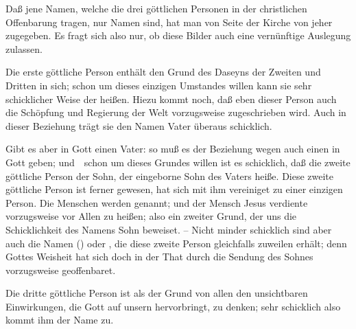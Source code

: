 Daß jene Namen, welche die drei göttlichen Personen in der christlichen Offenbarung tragen, nur  Namen sind, hat man von Seite der Kirche von jeher zugegeben. Es fragt sich also nur, ob diese Bilder auch eine vernünftige Auslegung zulassen.
\begin{aufza}
\item Die erste göttliche Person enthält den Grund des Daseyns der Zweiten und Dritten in sich; schon um dieses einzigen Umstandes willen kann sie sehr schicklicher Weise der  heißen. Hiezu kommt noch, daß eben dieser Person auch die Schöpfung und Regierung der Welt vorzugsweise zugeschrieben wird. Auch in dieser Beziehung trägt sie den Namen Vater überaus schicklich.
\item Gibt es aber in Gott einen Vater: so muß es der Beziehung wegen auch einen  in Gott geben; und~\ schon um dieses Grundes willen ist es schicklich, daß die zweite göttliche Person der Sohn, der eingeborne Sohn des Vaters heiße. Diese zweite göttliche Person ist ferner  gewesen, hat sich mit ihm vereiniget zu einer einzigen Person. Die Menschen werden  genannt; und der Mensch Jesus verdiente vorzugsweise vor Allen  zu heißen; also ein zweiter Grund, der uns die Schicklichkeit des Namens Sohn beweiset. -- Nicht minder schicklich sind aber auch die Namen  () oder , die diese zweite Person gleichfalls zuweilen erhält; denn Gottes Weisheit hat sich doch in der That durch die Sendung des Sohnes vorzugsweise geoffenbaret.
\item Die dritte göttliche Person ist als der Grund von allen den unsichtbaren Einwirkungen, die Gott auf unsern  hervorbringt, zu denken; sehr schicklich also kommt ihm der Name  zu.
\end{aufza}

